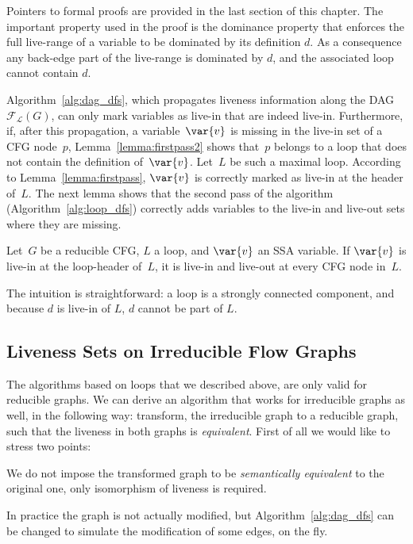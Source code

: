 Pointers to formal proofs are provided in the last section of this chapter.
The important property used in the proof is the dominance property that enforces the full live-range of a variable to be dominated by its definition $d$.
As a consequence any back-edge part of the live-range is dominated by $d$, and the associated loop cannot contain $d$.

Algorithm~\ref{alg:dag_dfs}, which propagates liveness information along the DAG $\mathcal{F}_\mathcal{L}(G)$, can only mark variables as live-in that are indeed live-in.
Furthermore, if, after this propagation, a variable~$\var{v}$ is missing in the live-in set of a CFG node~$p$, Lemma~\ref{lemma:firstpass2} shows that~$p$ belongs to a loop that does not contain the definition of~$\var{v}$.
Let~$L$ be such a maximal loop.
According to Lemma~\ref{lemma:firstpass}, $\var{v}$ is correctly marked as live-in at the header of~$L$.
The next lemma shows that the second pass of the algorithm (Algorithm~\ref{alg:loop_dfs}) correctly adds variables to the live-in and live-out sets where they are missing.

\begin{lemma}
	\label{lemma:secondpass}
	Let~$G$ be a reducible CFG, $L$ a loop, and $\var{v}$ an SSA variable.
	If $\var{v}$ is live-in at the loop-header of~$L$, it is live-in and live-out at every CFG node in~$L$.
\end{lemma}

The intuition is straightforward: a loop is a strongly connected component, and because $d$ is live-in of $L$, $d$ cannot be part of $L$. 


 \subsection{Liveness Sets on Irreducible Flow Graphs}
\label{sec:irreducible}

The algorithms based on loops that we described above, are only valid for reducible graphs.
We can derive an algorithm that works for irreducible graphs as well, in the following way:
transform, the irreducible graph to a reducible graph, such that the liveness in both graphs is \emph{equivalent}.
First of all we would like to stress two points:
\begin{asparaenum}[(1)]
\item We do not impose the transformed graph to be \emph{semantically equivalent} to the original one, only isomorphism of liveness is required. 
\item In practice the graph is not actually modified, but Algorithm~\ref{alg:dag_dfs} can be changed to simulate the modification of some edges, on the fly.
\end{asparaenum}

